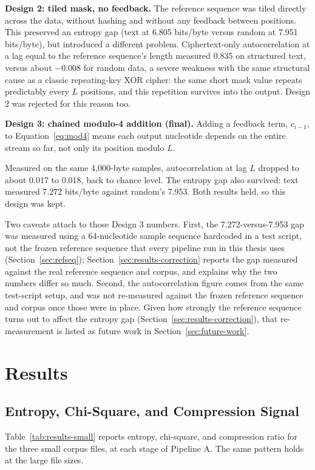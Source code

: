 \documentclass[12pt,a4paper,twoside]{report}
\numberwithin{equation}{chapter}
\begin{document}
\textbf{Design 2: tiled mask, no feedback.} The reference sequence was
tiled directly across the data, without hashing and without any
feedback between positions. This preserved an entropy gap (text at
6.805 bits/byte versus random at 7.951 bits/byte), but introduced a
different problem. Ciphertext-only autocorrelation at a lag equal to
the reference sequence's length measured 0.835 on structured text,
versus about $-0.008$ for random data, a severe weakness with the same
structural cause as a classic repeating-key XOR cipher: the same short
mask value repeats predictably every $L$ positions, and this
repetition survives into the output. Design 2 was rejected for this
reason too.

\textbf{Design 3: chained modulo-4 addition (final).} Adding a feedback
term, $c_{i-1}$, to Equation~\ref{eq:mod4} means each output nucleotide
depends on the entire stream so far, not only its position modulo $L$.

Measured on the same 4,000-byte samples, autocorrelation at lag $L$
dropped to about 0.017 to 0.018, back to chance level. The entropy gap also survived: text measured 7.272 bits/byte against random's 7.953. Both results held, so this design was kept.

Two caveats attach to those Design 3 numbers. First, the
7.272-versus-7.953 gap was measured using a
64-nucleotide sample sequence hardcoded in a test script, not the frozen reference sequence that every pipeline run in this thesis uses (Section~\ref{sec:refseq}); Section~\ref{sec:results-correction}
reports the gap measured against the real reference sequence
and corpus, and explains why the two numbers differ so much. Second,
the autocorrelation figure comes from the same test-script setup, and
was not re-measured against the frozen reference sequence and corpus
once those were in place. Given how strongly the reference sequence
turns out to affect the entropy gap
(Section~\ref{sec:results-correction}), that re-measurement is listed
as future work in Section~\ref{sec:future-work}.

\chapter{Results}
\label{ch:results}


\section{Entropy, Chi-Square, and Compression Signal}
\label{sec:results-entropy}
Table~\ref{tab:results-small} reports entropy, chi-square, and
compression ratio for the three small corpus files, at each stage of
Pipeline A. The same pattern holds at the large file sizes.
\end{document}
